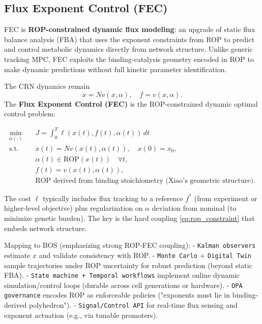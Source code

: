 \documentclass[11pt,a4paper]{article}
\begin{document}
\subsection{Flux Exponent Control (FEC)}

FEC is \textbf{ROP-constrained dynamic flux modeling}: an upgrade of static flux balance analysis (FBA) that uses the exponent constraints from ROP to predict and control metabolic dynamics directly from network structure. Unlike generic tracking MPC, FEC exploits the binding-catalysis geometry encoded in ROP to make dynamic predictions without full kinetic parameter identification.

The CRN dynamics remain
\[
\dot{x} = N v(x, \alpha), \quad f = v(x, \alpha).
\]
The \textbf{Flux Exponent Control (FEC)} is the ROP-constrained dynamic optimal control problem:

\begin{align}
\min_{\alpha(\cdot)} \quad & J = \int_0^T \ell(x(t), f(t), \alpha(t)) \, dt \label{eq:fec_cost} \\
\text{s.t.} \quad & \dot{x}(t) = N v(x(t), \alpha(t)), \quad x(0) = x_0, \label{eq:dynamics} \\
& \alpha(t) \in \text{ROP}(x(t)) \quad \forall t, \label{eq:rop_constraint} \\
& f(t) = v(x(t), \alpha(t)), \label{eq:flux} \\
& \text{ROP derived from binding stoichiometry (Xiao's geometric structure)}.
\end{align}

The cost \(\ell\) typically includes flux tracking to a reference \(f^*\) (from experiment or higher-level objective) plus regularization on \(\alpha\) deviation from nominal (to minimize genetic burden). The key is the hard coupling \eqref{eq:rop_constraint} that embeds network structure.

Mapping to BOS (emphasizing strong ROP-FEC coupling):
- \texttt{Kalman observers} estimate \(x\) and validate consistency with ROP.
- \texttt{Monte Carlo} + \texttt{Digital Twin} sample trajectories under ROP uncertainty for robust prediction (beyond static FBA).
- \texttt{State machine + Temporal workflows} implement online dynamic simulation/control loops (durable across cell generations or hardware).
- \texttt{OPA governance} encodes ROP as enforceable policies ("exponents must lie in binding-derived polyhedron").
- \texttt{Signal/Control API} for real-time flux sensing and exponent actuation (e.g., via tunable promoters).
\end{document}
